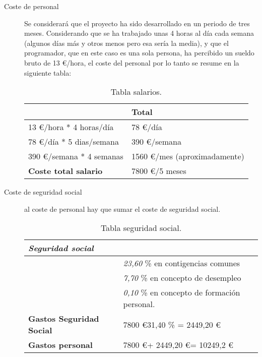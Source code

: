 \begin{description}
	\item[Coste de personal] Se considerará que el proyecto ha sido desarrollado en un periodo de tres meses.  Considerando que se ha trabajado unas 4 horas al día cada semana (algunos días más y otros menos pero esa sería la media), y que el programador, que en este caso es una sola persona, ha percibido un sueldo bruto de 13 \euro /hora, el coste del personal por lo tanto se resume en la siguiente tabla:
	
	\begin{table}[htbp]
		\begin{center}
			\begin{tabular}{|l|l|}
				\hline
				& Total \\
				\hline \hline
				13 \euro /hora * 4 horas/día &   78 \euro /día \\ \hline
				78 \euro /día * 5 dias/semana &   390 \euro /semana \\ \hline
				390 \euro /semana * 4 semanas &   1560 \euro /mes (aproximadamente)\\ \hline
				\textbf{Coste total salario} &   7800 \euro /5 meses \\ \hline
			\end{tabular}
			\caption{Tabla salarios.}
			\label{tabla:salarios}
		\end{center}
	\end{table}
	
	\item[Coste de seguridad social] al coste de personal hay que sumar el coste de seguridad social. 
	
	
	\begin{table}[htbp]
		\begin{center}
			\begin{tabular}{|l|l|}
				\hline
				\emph{Seguridad social} &  \\
				\hline \hline
				& \emph{23,60} \% en contigencias comunes \\ \hline
				&   \emph{7,70} \% en concepto de desempleo \\ \hline
				&   \emph{0,10} \% en concepto de formación personal. \\ \hline
				\textbf{Gastos Seguridad Social}  &   7800 \euro  * 31,40 \% =  2449,20 \euro \\ \hline
				\textbf{Gastos personal}  &  7800 \euro  + 2449,20 \euro  = 10249,2 \euro  \\ \hline
			\end{tabular}
			\caption{Tabla seguridad social.}
			\label{tabla:ssocial}
		\end{center}
	\end{table}
	

\end{description}
